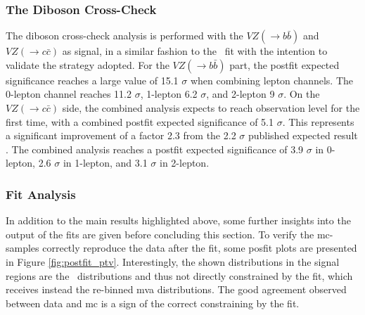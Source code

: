 \subsubsection{The Diboson Cross-Check}\label{subsec-DibosonC}
The diboson cross-check analysis is performed with the $VZ (\rightarrow b\bar{b})$ and $VZ (\rightarrow c\bar{c})$ as signal, in a similar fashion to the \vhbc\ fit with the intention to validate the strategy adopted. For the $VZ (\rightarrow b\bar{b})$ part, the postfit expected significance reaches a large value of 15.1 $\sigma$ when combining lepton channels. The 0-lepton channel reaches 11.2 $\sigma$, 1-lepton 6.2 $\sigma$, and 2-lepton 9 $\sigma$. On the $VZ (\rightarrow c\bar{c})$ side, the combined analysis expects to reach observation level for the first time, with a combined postfit expected significance of 5.1 $\sigma$. This represents a significant improvement of a factor 2.3 from the 2.2 $\sigma$ published expected result \cite{Collaboration:2721696}. The combined analysis reaches a postfit expected significance of 3.9 $\sigma$ in 0-lepton, 2.6 $\sigma$ in 1-lepton, and 3.1 $\sigma$ in 2-lepton.

\subsubsection{Fit Analysis}
In addition to the main results highlighted above, some further insights into the output of the fits are given before concluding this section. To verify the \gls{mc}-samples correctly reproduce the data after the fit, some posfit plots are presented in Figure \ref{fig:postfit_ptv}. Interestingly, the shown distributions in the signal regions are the \ptv\ distributions and thus not directly constrained by the fit, which receives instead the re-binned \gls{mva} distributions. The good agreement observed between data and \gls{mc} is a sign of the correct constraining by the fit. \\

